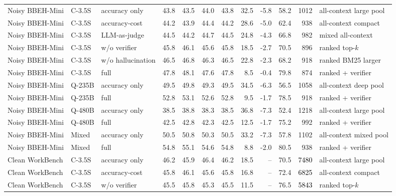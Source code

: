 \begin{longtable}{lllrrrrrrrrl}
\midrule
Noisy BBEH-Mini & C-3.5S & accuracy only & 43.8 & 43.5 & 44.0 & 43.8 & 32.5 & -5.8 & 58.2 & 1012 & all-context large pool \\
Noisy BBEH-Mini & C-3.5S & accuracy-cost & 44.2 & 43.9 & 44.4 & 44.2 & 28.6 & -5.0 & 62.4 & 938 & all-context compact \\
Noisy BBEH-Mini & C-3.5S & LLM-as-judge & 44.5 & 44.2 & 44.7 & 44.5 & 24.8 & -4.3 & 66.8 & 982 & mixed all-context \\
Noisy BBEH-Mini & C-3.5S & \tracescore{} w/o verifier & 45.8 & 46.1 & 45.6 & 45.8 & 18.5 & -2.7 & 70.5 & 896 & ranked top-$k$ \\
Noisy BBEH-Mini & C-3.5S & \tracescore{} w/o hallucination & 46.5 & 46.8 & 46.3 & 46.5 & 22.8 & -2.3 & 68.2 & 918 & ranked BM25 larger \\
\rowcolor{tracesoft}
Noisy BBEH-Mini & C-3.5S & full \tracescore{} & 47.8 & 48.1 & 47.6 & 47.8 & 8.5 & -0.4 & 79.8 & 874 & ranked + verifier \\
Noisy BBEH-Mini & Q-235B & accuracy only & 49.5 & 49.8 & 49.3 & 49.5 & 34.5 & -6.3 & 56.5 & 1058 & all-context deep pool \\
\rowcolor{tracesoft}
Noisy BBEH-Mini & Q-235B & full \tracescore{} & 52.8 & 53.1 & 52.6 & 52.8 & 9.5 & -1.7 & 78.5 & 918 & ranked + verifier \\
Noisy BBEH-Mini & Q-480B & accuracy only & 38.5 & 38.8 & 38.3 & 38.5 & 36.8 & -7.3 & 52.4 & 1218 & all-context large pool \\
\rowcolor{tracesoft}
Noisy BBEH-Mini & Q-480B & full \tracescore{} & 42.5 & 42.8 & 42.3 & 42.5 & 12.5 & -1.7 & 75.2 & 992 & ranked + verifier \\
Noisy BBEH-Mini & Mixed & accuracy only & 50.5 & 50.8 & 50.3 & 50.5 & 33.2 & -7.3 & 57.8 & 1102 & all-context mixed pool \\
\rowcolor{tracesoft}
Noisy BBEH-Mini & Mixed & full \tracescore{} & 54.8 & 55.1 & 54.6 & 54.8 & 8.8 & -2.0 & 80.5 & 938 & ranked + verifier \\
\midrule
Clean WorkBench & C-3.5S & accuracy only & 46.2 & 45.9 & 46.4 & 46.2 & 18.5 & -- & 70.5 & \textcolor{black}{7480} & all-context large pool \\
Clean WorkBench & C-3.5S & accuracy-cost & 45.8 & 46.1 & 45.6 & 45.8 & 16.8 & -- & 72.4 & \textcolor{black}{6825} & all-context compact \\
Clean WorkBench & C-3.5S & \tracescore{} w/o verifier & 45.5 & 45.8 & 45.3 & 45.5 & 11.5 & -- & 76.5 & \textcolor{black}{5843} & ranked top-$k$ \\

\end{longtable}
